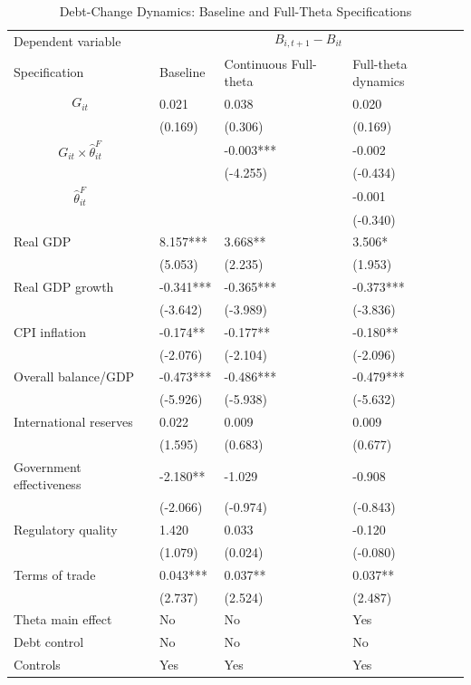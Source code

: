 \begin{table}[H]\centering
\begin{threeparttable}
\caption{Debt-Change Dynamics: Baseline and Full-Theta Specifications}
\label{tab:debt_change_combined_fulltheta}
\scriptsize
\begin{tabularx}{\textwidth}{lYYY}
\toprule
Dependent variable &  \\
\cmidrule(lr){2-4}
Specification & Baseline & Continuous Full-theta & Full-theta dynamics \\
\midrule
$$G_{it}$$ & 0.021 & 0.038 & 0.020 \\
 & (0.169) & (0.306) & (0.169) \\
$$G_{it}\times\widehat{\theta}^{F}_{it}$$ &  & -0.003*** & -0.002 \\
 &  & (-4.255) & (-0.434) \\
$$\widehat{\theta}^{F}_{it}$$ &  &  & -0.001 \\
 &  &  & (-0.340) \\
Real GDP & 8.157*** & 3.668** & 3.506* \\
 & (5.053) & (2.235) & (1.953) \\
Real GDP growth & -0.341*** & -0.365*** & -0.373*** \\
 & (-3.642) & (-3.989) & (-3.836) \\
CPI inflation & -0.174** & -0.177** & -0.180** \\
 & (-2.076) & (-2.104) & (-2.096) \\
Overall balance/GDP & -0.473*** & -0.486*** & -0.479*** \\
 & (-5.926) & (-5.938) & (-5.632) \\
International reserves & 0.022 & 0.009 & 0.009 \\
 & (1.595) & (0.683) & (0.677) \\
Government effectiveness & -2.180** & -1.029 & -0.908 \\
 & (-2.066) & (-0.974) & (-0.843) \\
Regulatory quality & 1.420 & 0.033 & -0.120 \\
 & (1.079) & (0.024) & (-0.080) \\
Terms of trade & 0.043*** & 0.037** & 0.037** \\
 & (2.737) & (2.524) & (2.487) \\
\midrule
Theta main effect & No & No & Yes \\
Debt control & No & No & No \\
Controls & Yes & Yes & Yes \\

\end{tabularx}
\end{threeparttable}
\end{table}
